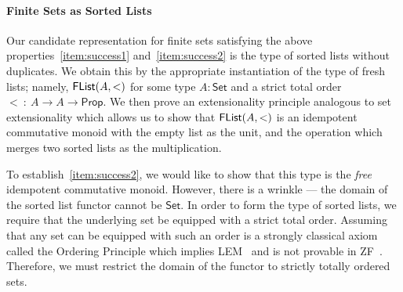 \documentclass[a4paper]{easychair}
\newtheorem{theorem}{Theorem}
\newtheorem{definition}{Definition}
\newcommand\bv[1]{{\AgdaBound{$#1$}}}
\newcommand\ty[1]{\AgdaDatatype{$#1$}}
\newcommand{\flistsymb}{\AgdaDatatype{FList}}
\newcommand{\flist}[2]{\ensuremath{\flistsymb(#1,#2)}}
\newcommand{\freshfor}{\AgdaDatatype{\#}}
\newcommand\nil{\AgdaInductiveConstructor{nil}}
\newcommand\cons{\AgdaInductiveConstructor{cons}}
\newcommand\nilF{\AgdaInductiveConstructor{nil$_{\#}$}}
\newcommand\consF{\AgdaInductiveConstructor{cons$_{\#}$}}
\newcommand\univ{\mathsf{Type}} %
\newcommand\setuniv{\mathsf{Set}} %
\newcommand\propuniv{\mathsf{Prop}} %
\begin{document}


\paragraph{Finite Sets as Sorted Lists}
Our candidate representation for finite sets satisfying the above properties~\eqref{item:success1} and~\eqref{item:success2} is the type of sorted lists without duplicates.
We obtain this by the appropriate instantiation of the type of fresh lists;
namely, \flist{A}{<} for some type $A : \setuniv$ and a strict total order $<~:~A \to A \to \propuniv$.
We then prove an extensionality principle analogous to set extensionality which allows us to show that \flist{A}{<} is an idempotent commutative monoid
with the empty list \nil{} as the unit,
and the operation which merges two sorted lists as the multiplication.


To establish~\eqref{item:success2}, we would like to show that this type is the \emph{free} idempotent commutative monoid.
However, there is a wrinkle --- the domain of the sorted list functor cannot be $\setuniv$.
In order to form the type of sorted lists, we require that the underlying set be equipped with a strict total order.
Assuming that any set can be equipped with such an order is a strongly classical axiom called the Ordering Principle which implies LEM~\cite{swanOPLEM} and is not provable in ZF~\cite{jech1973choice}.
Therefore, we must restrict the domain of the functor to strictly totally ordered sets.
\end{document}
